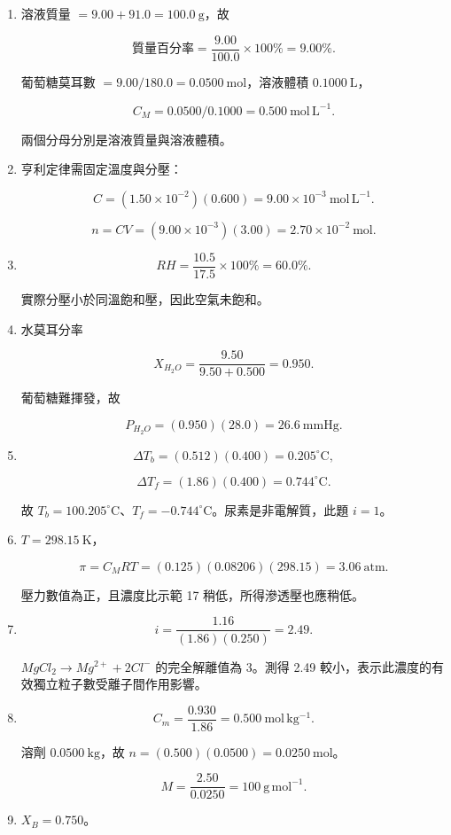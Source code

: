 \documentclass[11pt,a4paper]{article}
\begin{document}
\begin{enumerate}
\def\labelenumi{\arabic{enumi}.}
\item
  溶液質量 \(=9.00+91.0=100.0\ \mathrm g\)，故

  \[
  \text{質量百分率}=\frac{9.00}{100.0}\times100\%=9.00\%.
  \]

  葡萄糖莫耳數 \(=9.00/180.0=0.0500\ \mathrm{mol}\)，溶液體積 \(0.1000\ \mathrm L\)，

  \[
  C_M=0.0500/0.1000=0.500\ \mathrm{mol\,L^{-1}}.
  \]

  兩個分母分別是溶液質量與溶液體積。
\item
  亨利定律需固定溫度與分壓：

  \[
  C=(1.50\times10^{-2})(0.600)=9.00\times10^{-3}\ \mathrm{mol\,L^{-1}}.
  \]

  \[
  n=CV=(9.00\times10^{-3})(3.00)=2.70\times10^{-2}\ \mathrm{mol}.
  \]
\item
  \[
  RH=\frac{10.5}{17.5}\times100\%=60.0\%.
  \]

  實際分壓小於同溫飽和壓，因此空氣未飽和。
\item
  水莫耳分率

  \[
  X_{H_2O}=\frac{9.50}{9.50+0.500}=0.950.
  \]

  葡萄糖難揮發，故

  \[
  P_{H_2O}=(0.950)(28.0)=26.6\ \mathrm{mmHg}.
  \]
\item
  \[
  \Delta T_b=(0.512)(0.400)=0.205^\circ\mathrm C,
  \]

  \[
  \Delta T_f=(1.86)(0.400)=0.744^\circ\mathrm C.
  \]

  故 \(T_b=100.205^\circ\mathrm C\)、\(T_f=-0.744^\circ\mathrm C\)。尿素是非電解質，此題 \(i=1\)。
\item
  \(T=298.15\ \mathrm K\)，

  \[
  \pi=C_MRT=(0.125)(0.08206)(298.15)=3.06\ \mathrm{atm}.
  \]

  壓力數值為正，且濃度比示範 17 稍低，所得滲透壓也應稍低。
\item
  \[
  i=\frac{1.16}{(1.86)(0.250)}=2.49.
  \]

  \(MgCl_2\rightarrow Mg^{2+}+2Cl^-\) 的完全解離值為 3。測得 2.49 較小，表示此濃度的有效獨立粒子數受離子間作用影響。
\item
  \[
  C_m=\frac{0.930}{1.86}=0.500\ \mathrm{mol\,kg^{-1}}.
  \]

  溶劑 \(0.0500\ \mathrm{kg}\)，故 \(n=(0.500)(0.0500)=0.0250\ \mathrm{mol}\)。

  \[
  M=\frac{2.50}{0.0250}=100\ \mathrm{g\,mol^{-1}}.
  \]
\item
  \(X_B=0.750\)。


\end{enumerate}
\end{document}
